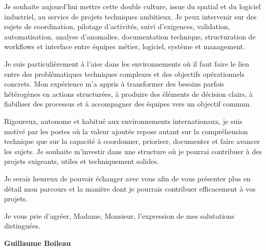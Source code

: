\documentclass[11pt,a4paper]{altacv}
\begin{document}
{Je souhaite aujourd'hui mettre cette double culture, issue du spatial et du logiciel industriel, au service de projets techniques ambitieux. Je peux intervenir sur des sujets de coordination, pilotage d'activités, suivi d'exigences, validation, automatisation, analyse d'anomalies, documentation technique, structuration de workflows et interface entre équipes métier, logiciel, système et management.

Je suis particulièrement à l'aise dans les environnements où il faut faire le lien entre des problématiques techniques complexes et des objectifs opérationnels concrets. Mon expérience m'a appris à transformer des besoins parfois hétérogènes en actions structurées, à produire des éléments de décision clairs, à fiabiliser des processus et à accompagner des équipes vers un objectif commun.

Rigoureux, autonome et habitué aux environnements internationaux, je suis motivé par les postes où la valeur ajoutée repose autant sur la compréhension technique que sur la capacité à coordonner, prioriser, documenter et faire avancer les sujets. Je souhaite m'investir dans une structure où je pourrai contribuer à des projets exigeants, utiles et techniquement solides.

Je serais heureux de pouvoir échanger avec vous afin de vous présenter plus en détail mon parcours et la manière dont je pourrais contribuer efficacement à vos projets.

Je vous prie d'agréer, Madame, Monsieur, l'expression de mes salutations distinguées.

\textbf{Guillaume Boileau}

}
\end{document}
